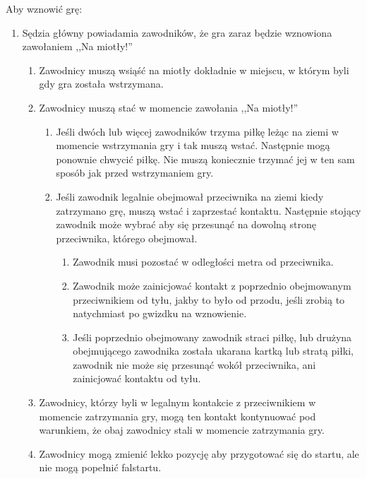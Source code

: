 \documentclass[11pt,a4paper]{article}
\renewcommand{\subsubsection}[1]{
  \oldsubsubsection{#1}%
  \label{\thesubsubsection}
}
\begin{document}
\subsubsection{Wznawianie gry}

Aby wznowić grę:

\begin{enumerate}

\item
  Sędzia główny powiadamia zawodników, że gra zaraz będzie wznowiona
  zawołaniem ,,Na miotły!''

  \begin{enumerate}
  
  \item
    Zawodnicy muszą wsiąść na miotły dokładnie w miejscu, w którym byli
    gdy gra została wstrzymana.
  \item
    Zawodnicy muszą stać w momencie zawołania ,,Na miotły!''

    \begin{enumerate}
    
    \item
      Jeśli dwóch lub więcej zawodników trzyma piłkę leżąc na ziemi w
      momencie wstrzymania gry i tak muszą wstać. Następnie mogą
      ponownie chwycić piłkę. Nie muszą koniecznie trzymać jej w ten sam
      sposób jak przed wstrzymaniem gry.
    \item
      Jeśli zawodnik legalnie obejmował przeciwnika na ziemi kiedy
      zatrzymano grę, muszą wstać i zaprzestać kontaktu. Następnie
      stojący zawodnik może wybrać aby się przesunąć na dowolną stronę
      przeciwnika, którego obejmował.

      \begin{enumerate}
      
      \item
        Zawodnik musi pozostać w odległości metra od przeciwnika.
      \item
        Zawodnik może zainicjować kontakt z poprzednio obejmowanym
        przeciwnikiem od tyłu, jakby to było od przodu, jeśli zrobią to
        natychmiast po gwizdku na wznowienie.
      \item
        Jeśli poprzednio obejmowany zawodnik straci piłkę, lub drużyna
        obejmującego zawodnika została ukarana kartką lub stratą piłki,
        zawodnik nie może się przesunąć wokół przeciwnika, ani
        zainicjować kontaktu od tyłu.
      \end{enumerate}
    \end{enumerate}
  \item
    Zawodnicy, którzy byli w legalnym kontakcie z przeciwnikiem w
    momencie zatrzymania gry, mogą ten kontakt kontynuować pod
    warunkiem, że obaj zawodnicy stali w momencie zatrzymania gry.
  \item
    Zawodnicy mogą zmienić lekko pozycję aby przygotować się do startu,
    ale nie mogą popełnić falstartu.


\end{enumerate}
\end{enumerate}
\end{document}
